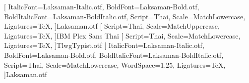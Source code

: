 \usepackage{fontspec}
\usepackage[english]{babel}
[%
	ItalicFont={Laksaman-Italic.otf},%
	BoldFont={Laksaman-Bold.otf},%
	BoldItalicFont={Laksaman-BoldItalic.otf},%
	Script=Thai,%
	Scale=MatchLowercase,%
	Ligatures=TeX,
]{Laksaman.otf} %
[%
	Script=Thai,%
	Scale=MatchUppercase,%
	Ligatures=TeX,
]{IBM Plex Sans Thai} %
[%
	Script=Thai,%
	Scale=MatchLowercase,%
	Ligatures=TeX,
]{TlwgTypist.otf} %
\newfontfamily{\thaifont}[%
	ItalicFont={Laksaman-Italic.otf},%
	BoldFont={Laksaman-Bold.otf},%
	BoldItalicFont={Laksaman-BoldItalic.otf},%
	Script=Thai,%
	Scale=MatchLowercase,%
	WordSpace=1.25,%
	Ligatures=TeX,
]{Laksaman.otf} %

\usepackage{luatexja} %
\usepackage[match]{luatexja-fontspec}

\usepackage{setspace}

